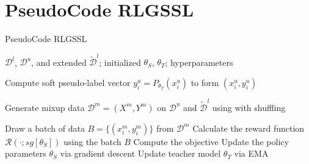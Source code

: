 \documentclass{beamer}
\begin{document}
\section{PseudoCode RLGSSL}
\begin{frame}{PseudoCode RLGSSL}

\begin{algorithm}[H]
\caption{RL-Guided SSL}
\scriptsize
\begin{algorithmic}

\Require $\mathcal{D}^l$, $\mathcal{D}^u$, and extended $\widetilde{\mathcal{D}}^l$; initialized $\theta_S$, $\theta_T$; hyperparameters


        \State Compute soft pseudo-label vector $y_i^u = P_{\theta_T}(x_i^u)$ to form $(x_i^u, y_i^u)$
    \EndFor

    \State Generate mixup data $\mathcal{D}^m = (X^m, Y^m)$ on $\mathcal{D}^u$ and $\widetilde{\mathcal{D}}^l$ using with shuffling

        \State Draw a batch of data $B = \{(x_i^m, y_i^m)\}$ from $\mathcal{D}^m$
        \State Calculate the reward function $\mathcal{R}(\cdot ; sg[\theta_S])$ using the batch $B$
        \State Compute the objective
        \State Update the policy parameters $\theta_S$ via gradient descent
        \State Update teacher model $\theta_T$ via EMA
    \EndFor

\EndFor

\end{algorithmic}
\end{algorithm}
\end{frame}

\end{document}
